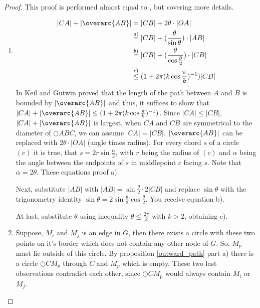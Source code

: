 \begin{proof}
This proof is performed almost equal to \cite{kanj}, but covering more details.
\renewcommand{\labelenumi}{(\roman{enumi})}%
\begin{enumerate}
\item 
\begin{equation*}
\begin{split}
|CA|+|\overarc{AB}| &= |CB| + 2\theta \cdot |OA| \\
&\stackrel{a)}{=}|CB| + (\frac{\theta}{\sin{\theta}})\cdot |AB| \\
&\stackrel{b)}{=} |CB| + (\frac{\theta}{\cos{\frac{\theta}{2}}}) \cdot |CB|\\
&\stackrel{c)}{\leq} (1+2\pi(k \cos{\frac{\pi}{k}})^{-1}) |CB|  
\end{split}
\end{equation*}
In \cite{keil} Keil and Gutwin proved that the length of the path between $A $ and $B $ is bounded by $|\overarc{AB}|$ and thus, it suffices to show that $|CA| + |\overarc{AB}|\leq (1+2\pi(k \cos{\frac{\pi}{k}})^{-1})$.
Since $|CA| \leq |CB| $, $|CA|+|\overarc{AB}| $ is largest, when $CA $ and $CB $ are symmetrical to the diameter of $\bigcirc{ABC} $, we can assume $|CA|=|CB| $.
$|\overarc{AB}| $ can be replaced with $2\theta \cdot |OA| $ (angle times radius).
For every chord $s $ of a circle $(c) $ it is true, that $s=2r\sin{\frac{\alpha}{2}} $, with $r $ being the radius of $(c) $ and $\alpha $ being the angle between the endpoints of $s $ in middlepoint $c $ facing $s $.
Note that $\alpha = 2\theta $. 
These equations proof a).

Next, substitute $|AB| $ with $|AB| = \sin{\frac{\theta}{2}} \cdot 2|CB| $ and replace $\sin{\theta} $ with the trigonometry identity $\sin{\theta}=2\sin{\frac{\theta}{2}} \cos{\frac{\theta}{2}} $.
You receive equation b).

At last, substitute $\theta $ using inequality $\theta \leq \frac{2\pi}{k} $ with $k > 2 $, obtaining c).

\item  Suppose, $M_i $ and $M_j $ is an edge in $G $, then there exists a circle with these two points on it's border which does not contain any other node of $G $.
So, $M_p $ must lie outside of this circle.
By proposition \ref{outward_path} part a) there is a circle $\bigcirc{CM_p} $ through $C $ and $M_p $ which is empty.
These two last observations contradict each other, since $\bigcirc{CM_p} $ would always contain $M_i $ or $M_j $.


\end{enumerate}
\end{proof}
